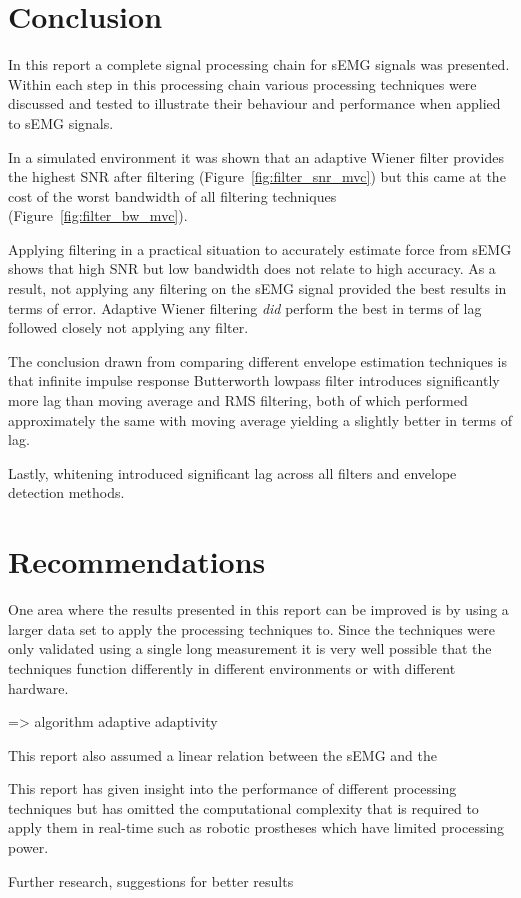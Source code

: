 \section{Conclusion}
In this report a complete signal processing chain for sEMG signals was presented. Within each step in this processing chain various processing techniques were discussed and tested to illustrate their behaviour and performance when applied to sEMG signals.

In a simulated environment it was shown that an adaptive Wiener filter provides the highest SNR after filtering (Figure~\ref{fig:filter_snr_mvc}) but this came at the cost of the worst bandwidth of all filtering techniques (Figure~\ref{fig:filter_bw_mvc}).

Applying filtering in a practical situation to accurately estimate force from sEMG shows that high SNR but low bandwidth does not relate to high accuracy. As a result, not applying any filtering on the sEMG signal provided the best results in terms of error. Adaptive Wiener filtering \textit{did} perform the best in terms of lag followed closely not applying any filter. 

The conclusion drawn from comparing different envelope estimation techniques is that infinite impulse response Butterworth lowpass filter introduces significantly more lag than moving average and RMS filtering, both of which performed approximately the same with moving average yielding a slightly better in terms of lag.

Lastly, whitening introduced significant lag across all filters and envelope detection methods.

\section{Recommendations}
One area where the results presented in this report can be improved is by using a larger data set to apply the processing techniques to. Since the techniques were only validated using a single long measurement it is very well possible that the techniques function differently in different environments or with different hardware.

=> algorithm adaptive adaptivity

This report also assumed a linear relation between the sEMG and the 

This report has given insight into the performance of different processing techniques but has omitted the computational complexity that is required to apply them in real-time such as robotic prostheses \cite{semg_application_prosthesis} which have limited processing power. 



Further research, suggestions for better results